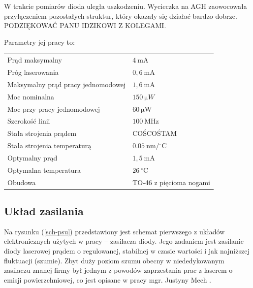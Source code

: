 \documentclass[a4paper,10pt]{article}
\begin{document}
W trakcie pomiarów dioda uległa uszkodzeniu. Wycieczka na AGH zaowocowała przyłączeniem pozostałych struktur, który okazały się działać bardzo dobrze. PODZIĘKOWAĆ PANU IDZIKOWI Z KOLEGAMI.

Parametry jej pracy to:
\begin{center}
\begin{tabular}{ll}
Prąd maksymalny & $4 ~\mathrm{mA}$\\
Próg laserowania & $0{,}6~\mathrm{mA}$\\
Maksymalny prąd pracy jednomodowej & $1{,}6~\mathrm{mA}$\\
Moc nominalna & $150~\mathrm{\mu }W$\\
Moc przy pracy jednomodowej & $60~\mathrm{\mu W}$\\
Szerokość linii & $100~\mathrm{MHz}$\\
Stała strojenia prądem & COŚCOŚTAM\\
Stała strojenia temperaturą & $0.05 ~\mathrm{nm/{}^{\circ}C}$\\
Optymalny prąd & $1{,}5 ~\mathrm{mA}$\\
Optymalna temperatura & $26~\mathrm{ {}^{\circ}C}$ \\
Obudowa & TO-46 z pięcioma nogami
\end{tabular}
\end{center}


\subsection{Układ zasilania}

Na rysunku (\ref{sch-psu}) przedstawiony jest schemat pierwszego z układów elektronicznych użytych w pracy -- zasilacza diody. Jego zadaniem jest zasilanie diody laserowej prądem o regulowanej, stabilnej w czasie wartości i jak najniższej fluktuacji (szumie). Zbyt duży poziom szumu obecny w niededykowanym zasilaczu znanej firmy był jednym z powodów zaprzestania prac z laserem o emisji powierzchniowej, co jest opisane w pracy mgr. Justyny Mech \cite{mgrJustynaMech}.
\end{document}
